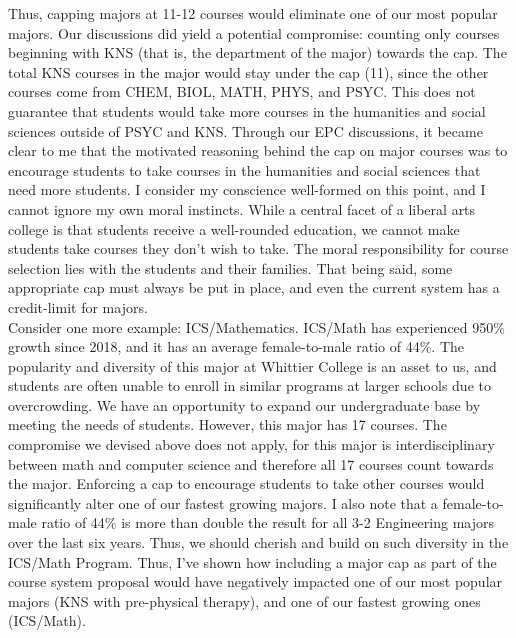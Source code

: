 \documentclass[../../../main.tex]{subfiles}
\begin{document}
Thus, capping majors at 11-12 courses would eliminate one of our most popular majors.  Our discussions did yield a potential compromise: counting only courses beginning with KNS (that is, the department of the major) towards the cap.  The total KNS courses in the major would stay under the cap (11), since the other courses come from CHEM, BIOL, MATH, PHYS, and PSYC.  This does not guarantee that students would take more courses in the humanities and social sciences outside of PSYC and KNS. Through our EPC discussions, it became clear to me that the motivated reasoning behind the cap on major courses was to encourage students to take courses in the humanities and social sciences that need more students.  I consider my conscience well-formed on this point, and I cannot ignore my own moral instincts.  While a central facet of a liberal arts college is that students receive a well-rounded education, we cannot make students take courses they don't wish to take.  The moral responsibility for course selection lies with the students and their families.  That being said, some appropriate cap must always be put in place, and even the current system has a credit-limit for majors.
\\
\vspace{0.25cm}
Consider one more example: ICS/Mathematics.  ICS/Math has experienced 950\% growth since 2018, and it has an average female-to-male ratio of 44\%.  The popularity and diversity of this major at Whittier College is an asset to us, and students are often unable to enroll in similar programs at larger schools due to overcrowding.  We have an opportunity to expand our undergraduate base by meeting the needs of students.  However, this major has 17 courses.  The compromise we devised above does not apply, for this major is interdisciplinary between math and computer science and therefore all 17 courses count towards the major.  Enforcing a cap to encourage students to take other courses would significantly alter one of our fastest growing majors.  I also note that a female-to-male ratio of 44\% is more than double the result for all 3-2 Engineering majors over the last six years.  Thus, we should cherish and build on such diversity in the ICS/Math Program.  Thus, I've shown how including a major cap as part of the course system proposal would have negatively impacted one of our most popular majors (KNS with pre-physical therapy), and one of our fastest growing ones (ICS/Math).
\\
\vspace{0.25cm}
\end{document}

